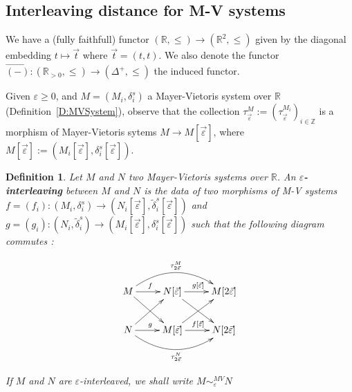 \documentclass[a4paper, english, 11pt]{article}
\newcommand{\0}{\vec{0}}
\newcommand{\R}[0]{\mathbb{R}}
\newcommand{\Z}[0]{\mathbb{Z}}
\newtheorem{defi}[prop]{Definition}
\begin{document}

\subsection{Interleaving distance for M-V systems}
We have a (fully faithfull) functor $(\R ,\leq) \to (\R^2, \leq)$ given by the diagonal embedding  $t\mapsto \vec{t}$ where $\vec{t}=(t,t)$. We also denote  the functor $\vec{(-)}: (\R_{>0} ,\leq) \to (\Delta^+, \leq)$  the induced functor. 

\smallskip

Given $\varepsilon \geq 0$, and $M = (M_i,\delta_i^s)$ a Mayer-Vietoris system over $\R$ (Definition~\ref{D:MVSystem}), observe that the collection $\tau_{\vec{\varepsilon}}^M:=(\tau_{\vec{\varepsilon}}^{M_i})_{i\in\Z}$ is a morphism of Mayer-Vietoris sytems $M \longrightarrow M[\vec{\varepsilon}]$, where $M[\vec{\varepsilon}]:=(M_i[\vec{\varepsilon}],\delta_i^s[\vec{\varepsilon}])$.

\begin{defi}
Let $M$ and $N$ two Mayer-Vietoris systems over $\R$. An \textbf{$\varepsilon$-interleaving} between $M$ and $N$ is the data of two morphisms of M-V systems $f = (f_i) : (M_i,\delta_i^s) \longrightarrow (N_i[\vec{\varepsilon}],\tilde{\delta}_i^s [\vec{\varepsilon}])$ and $g = (g_i) : (N_i,\tilde{\delta}_i^s) \longrightarrow (M_i[\vec{\varepsilon}],\delta_i^s[\vec{\varepsilon}]) $ such that the following diagram commutes : 

\begin{equation}\label{eq:Interleaving} \xymatrix{
M  \ar[rd]\ar@/^0.7cm/[rr]^{\tau_{2\vec{\varepsilon}}^M} \ar[r]^{f} & N[\vec{\varepsilon}]  \ar[rd] \ar[r]^{g[\vec{\varepsilon}]} & M[2\vec{\varepsilon}] \\
N  \ar[ur]\ar@/_0.7cm/[rr]_{\tau_{2\vec{\varepsilon}}^N} \ar[r]^{g} & M[\vec{\varepsilon}]  \ar[ur] \ar[r]^{f[\vec{\varepsilon}]} & N[2\vec{\varepsilon}]
   } \end{equation}
   
If $M$ and $N$ are $\varepsilon$-interleaved, we shall write $M\sim_\varepsilon^{MV} N$

\end{defi}
\end{document}
